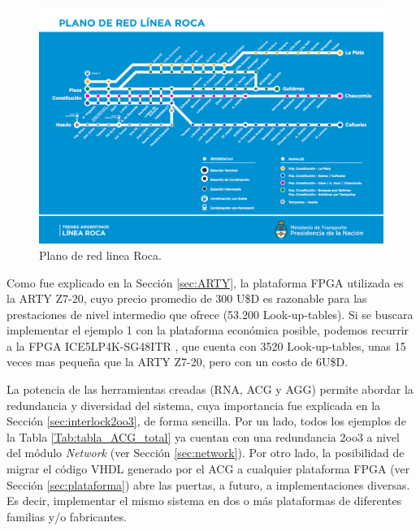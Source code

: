 	 \begin{figure}[H]
	 	\centering
	 	\includegraphics[origin = c, width=1\textwidth]{resultados-obtenidos/ejemplo1/images/mapa-linea-roca}
	 	\centering\caption{Plano de red linea Roca.}
	 	\label{fig:ROCA}
	 \end{figure}
	 
	 Como fue explicado en la Sección \ref{sec:ARTY}, la plataforma FPGA utilizada es la ARTY Z7-20, cuyo precio promedio de 300 U\$D es razonable para las prestaciones de nivel intermedio que ofrece (53.200 Look-up-tables). Si se buscara implementar el ejemplo 1 con la plataforma económica posible, podemos recurrir a la FPGA ICE5LP4K-SG48ITR \cite{LATTICE}, que cuenta con 3520 Look-up-tables, unas 15 veces mas pequeña que la ARTY Z7-20, pero con un costo de 6U\$D.
	 
	 La potencia de las herramientas creadas (RNA, ACG y AGG) permite abordar la redundancia y diversidad del sistema, cuya importancia fue explicada en la Sección \ref{sec:interlock2oo3}, de forma sencilla. Por un lado, todos los ejemplos de la Tabla \ref{Tab:tabla_ACG_total} ya cuentan con una redundancia 2oo3 a nivel del módulo \textit{Network} (ver Sección \ref{sec:network}). Por otro lado, la posibilidad de migrar el código VHDL generado por el ACG a cualquier plataforma FPGA (ver Sección \ref{sec:plataforma}) abre las puertas, a futuro, a implementaciones diversas. Es decir, implementar el mismo sistema en dos o más plataformas de diferentes familias y/o fabricantes.
	 
	 
	 
	 
	 
	 
	 
	